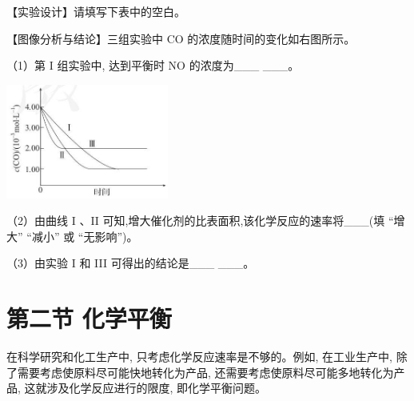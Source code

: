 \documentclass[10pt]{article}
\begin{document}
【实验设计】请填写下表中的空白。

\begin{center}
\end{center}

【图像分析与结论】三组实验中 \(\mathrm{{CO}}\) 的浓度随时间的变化如右图所示。

（1）第 I 组实验中, 达到平衡时 NO 的浓度为\_\_\_ \_\_\_。

\begin{center}
\includegraphics[max width=0.4\textwidth]{images/0190da9d-8bfd-732f-bc2c-0b21d0f13b91_36_789263.jpg}
\end{center}

（2）由曲线 \(\mathrm{I}\) 、II 可知,增大催化剂的比表面积,该化学反应的速率将\_\_\_(填 “增大” “减小” 或 “无影响”)。

（3）由实验 I 和 III 可得出的结论是\_\_\_ \_\_\_。

\section*{第二节 化学平衡}

在科学研究和化工生产中, 只考虑化学反应速率是不够的。例如, 在工业生产中, 除了需要考虑使原料尽可能快地转化为产品, 还需要考虑使原料尽可能多地转化为产品, 这就涉及化学反应进行的限度, 即化学平衡问题。
\end{document}
